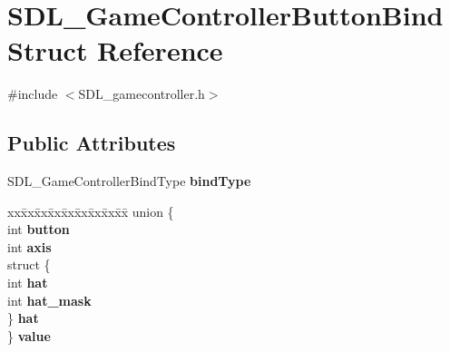\hypertarget{structSDL__GameControllerButtonBind}{\section{S\+D\+L\+\_\+\+Game\+Controller\+Button\+Bind Struct Reference}
\label{structSDL__GameControllerButtonBind}
}


{\ttfamily \#include $<$S\+D\+L\+\_\+gamecontroller.\+h$>$}

\subsection*{Public Attributes}
\begin{DoxyCompactItemize}
\item 
\hypertarget{structSDL__GameControllerButtonBind_a032fd941b0e8e5e2cdf52b7597f559b9}{S\+D\+L\+\_\+\+Game\+Controller\+Bind\+Type {\bfseries bind\+Type}}\label{structSDL__GameControllerButtonBind_a032fd941b0e8e5e2cdf52b7597f559b9}

\item 
\hypertarget{structSDL__GameControllerButtonBind_abd2c8882afcb03c554bdad5dfa31718c}{\begin{tabbing}
xx\=xx\=xx\=xx\=xx\=xx\=xx\=xx\=xx\=\kill
union \{\\
\hypertarget{unionSDL__GameControllerButtonBind_1_1@3_a2657029cfc39aa91b5b5342d4a037d95}{\>int {\bfseries button}\\
\hypertarget{unionSDL__GameControllerButtonBind_1_1@3_a2ffbc482f5aadcbb8df97d406708f456}{\>int {\bfseries axis}\\
\hypertarget{unionSDL__GameControllerButtonBind_1_1@3_a9a0ecc07e0b8bb686bfb9a5ee4b48a68}{\>struct \{\\
\hypertarget{structSDL__GameControllerButtonBind_1_1@3_1_1@4_aa71f0e94721b28ee35aec0d1ac1c200e}{\>\>int {\bfseries hat}\\
\hypertarget{structSDL__GameControllerButtonBind_1_1@3_1_1@4_a9f1197eb0a12d824946d59ee6c4a2999}{\>\>int {\bfseries hat\_mask}\\
\>\} {\bfseries hat}\\
\} {\bfseries value}}\label{structSDL__GameControllerButtonBind_abd2c8882afcb03c554bdad5dfa31718c}
\\

}}}}
\end{tabbing}}
\end{DoxyCompactItemize}
